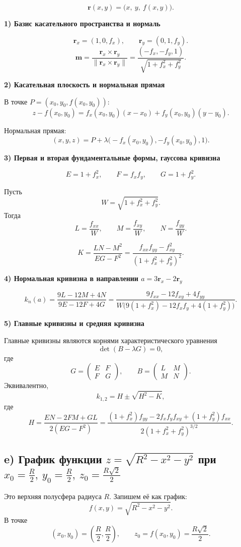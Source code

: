 \documentclass[12pt,a4paper]{article}
\begin{document}
\[
\mathbf r(x,y)=\bigl(x,\ y,\ f(x,y)\bigr).
\]

\textbf{1) Базис касательного пространства и нормаль}

\[
\mathbf r_x=(1,0,f_x),\qquad \mathbf r_y=(0,1,f_y).
\]
\[
\mathbf m=\frac{\mathbf r_x\times \mathbf r_y}{\|\mathbf r_x\times \mathbf r_y\|}
=\frac{(-f_x,-f_y,1)}{\sqrt{1+f_x^2+f_y^2}}.
\]

\textbf{2) Касательная плоскость и нормальная прямая}

В точке $P=(x_0,y_0,f(x_0,y_0))$:
\[
z-f(x_0,y_0)=f_x(x_0,y_0)(x-x_0)+f_y(x_0,y_0)(y-y_0).
\]

Нормальная прямая:
\[
(x,y,z)=P+\lambda\bigl(-f_x(x_0,y_0),-f_y(x_0,y_0),1\bigr).
\]

\textbf{3) Первая и вторая фундаментальные формы, гауссова кривизна}

\[
E=1+f_x^2,\qquad F=f_xf_y,\qquad G=1+f_y^2.
\]

Пусть
\[
W=\sqrt{1+f_x^2+f_y^2}.
\]
Тогда
\[
L=\frac{f_{xx}}{W},\qquad M=\frac{f_{xy}}{W},\qquad N=\frac{f_{yy}}{W}.
\]

\[
K=\frac{LN-M^2}{EG-F^2}
=\frac{f_{xx}f_{yy}-f_{xy}^2}{(1+f_x^2+f_y^2)^2}.
\]

\textbf{4) Нормальная кривизна в направлении $a=3\mathbf r_x-2\mathbf r_y$}

\[
k_n(a)=\frac{9L-12M+4N}{9E-12F+4G}
=\frac{9f_{xx}-12f_{xy}+4f_{yy}}{W\bigl(9(1+f_x^2)-12f_xf_y+4(1+f_y^2)\bigr)}.
\]

\textbf{5) Главные кривизны и средняя кривизна}

Главные кривизны являются корнями характеристического уравнения
\[
\det(B-\lambda G)=0,
\]
где
\[
G=\begin{pmatrix}E&F\\F&G\end{pmatrix},\qquad
B=\begin{pmatrix}L&M\\M&N\end{pmatrix}.
\]
Эквивалентно,
\[
k_{1,2}=H\pm\sqrt{H^2-K},
\]
где
\[
H=\frac{EN-2FM+GL}{2(EG-F^2)}
=\frac{(1+f_x^2)f_{yy}-2f_xf_yf_{xy}+(1+f_y^2)f_{xx}}{2(1+f_x^2+f_y^2)^{3/2}}.
\]

\subsection*{e) График функции $z=\sqrt{R^2-x^2-y^2}$ при $x_0=\frac R2,\ y_0=\frac R2,\ z_0=\frac{R\sqrt2}{2}$}

Это верхняя полусфера радиуса $R$. Запишем её как график:
\[
f(x,y)=\sqrt{R^2-x^2-y^2}.
\]
В точке
\[
\left(x_0,y_0\right)=\left(\frac R2,\frac R2\right),\qquad
z_0=f(x_0,y_0)=\frac{R\sqrt2}{2}.
\]
\end{document}
